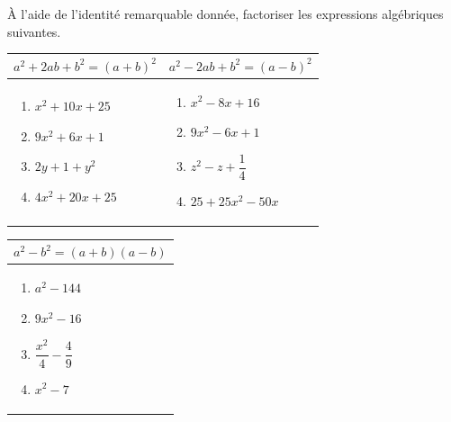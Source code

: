 \begin{exo}
	À l'aide de l'identité remarquable donnée, factoriser les expressions algébriques suivantes.

	\def\arraystretch{1.5}
	\begin{tabular}{m{3.5cm}|m{3.5cm}}
		$a^2 + 2ab + b^2 = (a + b)^2$ & $a^2 - 2ab + b^2 = (a - b)^2$ \\ \hline
		\begin{enumerate}[label=\alph*)]
			\item $x^2 + 10x + 25$
			\item $9x^2 + 6x + 1$
			\item $2y + 1 + y^2$
			\item $4x^2 + 20x + 25$
		\end{enumerate}
		                              &
		\begin{enumerate}[label=\alph*)]
			\item $x^2 - 8x + 16$
			\item $9x^2 - 6x + 1$
			\item $z^2 - z + \dfrac{1}{4}$
			\item $25 + 25x^2 - 50x$
		\end{enumerate}
	\end{tabular}

	\begin{center}
		\begin{tabular}{m{3.8cm}}
			$a^2 - b^2 = (a + b)(a - b)$ \\ \hline
			\begin{enumerate}[label=\alph*)]
				\item $a^2 - 144$
				\item $9x^2 - 16$
				\item $\dfrac{x^2}{4} - \dfrac{4}{9}$
				\item $x^2 - 7$
			\end{enumerate}
		\end{tabular}
	\end{center}
\end{exo}
